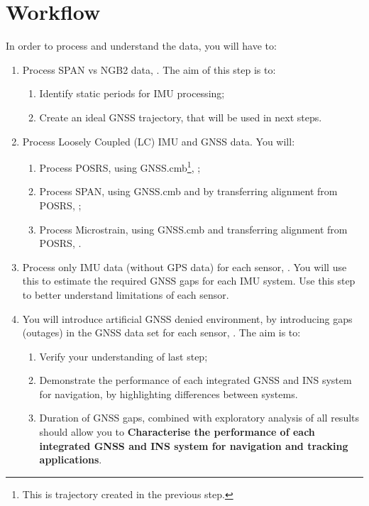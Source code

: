 \documentclass[11pt,fleqn]{book} %
\begin{document}
\section{Workflow}

In order to process and understand the data, you will have to:

\begin{enumerate}
	\item Process SPAN vs NGB2 data, . The aim of this step is to: 
	\begin{enumerate}
		\item Identify static periods for IMU processing;
		\item Create an ideal GNSS trajectory, that will be used in next steps.
	\end{enumerate}
	\item Process Loosely Coupled (LC) IMU and GNSS data. You will:
	\begin{enumerate}
		\item Process POSRS, using GNSS.cmb\footnote{This is trajectory created in the previous step.}, ;
		\item Process SPAN, using GNSS.cmb and by transferring alignment from POSRS, ;
		\item Process Microstrain, using GNSS.cmb and transferring alignment from POSRS, .
	\end{enumerate}
	\item Process only IMU data (without GPS data) for each sensor, . You will use this to estimate the required GNSS gaps for each IMU system. Use this step to better understand limitations of each sensor. 
	\item You will introduce artificial GNSS denied environment, by introducing gaps (outages) in the GNSS data set for each sensor, . The aim is to: 
	\begin{enumerate}
	\item Verify your understanding of last step;
	\item Demonstrate the performance of each integrated GNSS and INS system for navigation, by highlighting differences between systems.
	\item Duration of GNSS gaps, combined with exploratory analysis of all results should allow you to \textbf{Characterise the performance of each integrated GNSS and INS system for navigation and tracking applications}.

\end{enumerate}
\end{enumerate}
\end{document}
